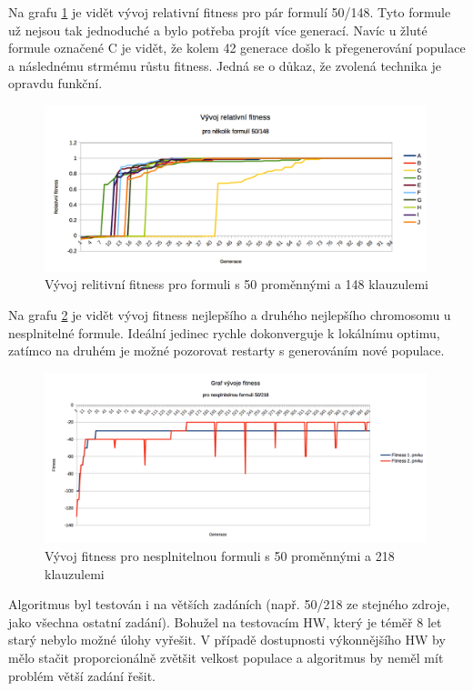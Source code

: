 \documentclass[a4paper]{article}
\begin{document}
	Na grafu \ref{graf-vyvoj-50} je vidět vývoj relativní fitness pro pár formulí 50/148. Tyto formule už nejsou tak jednoduché a bylo potřeba projít více generací. Navíc u žluté formule označené C je vidět, že kolem 42 generace došlo k přegenerování populace a následnému strmému růstu fitness. Jedná se o důkaz, že zvolená technika je opravdu funkční.
	
	\begin{figure}[h]\centering
		\includegraphics[width=0.99\textwidth]{graf-vyvoj-50-148.png} 
		\caption{Vývoj relitivní fitness pro formuli s 50 proměnnými a 148 klauzulemi}
		\label{graf-vyvoj-50}
	\end{figure}
	
	Na grafu \ref{graf-nesplnitelna} je vidět vývoj fitness nejlepšího a druhého nejlepšího chromosomu u nesplnitelné formule. Ideální jedinec rychle dokonverguje k lokálnímu optimu, zatímco na druhém je možné pozorovat restarty s generováním nové populace.
	
	\begin{figure}[h]\centering
		\includegraphics[width=0.99\textwidth]{graf-vyvoj-nesplnitelna.png} 
		\caption{Vývoj fitness pro nesplnitelnou formuli s 50 proměnnými a 218 klauzulemi}
		\label{graf-nesplnitelna}
	\end{figure}

	Algoritmus byl testován i na větších zadáních (např. 50/218 ze stejného zdroje, jako všechna ostatní zadání). Bohužel na testovacím HW, který je téměř 8 let starý nebylo možné úlohy vyřešit. V případě dostupnosti výkonnějšího HW by mělo stačit proporcionálně zvětšit velkost populace a algoritmus by neměl mít problém větší zadání řešit.
	
\end{document}
